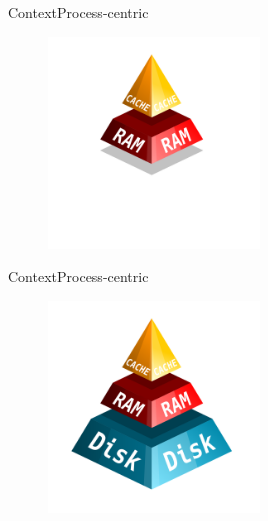 \documentclass[10pt]{beamer}
\begin{document}
\begin{frame}{Context}{Process-centric}
  \begin{figure}[ht]
    \centering
    \includegraphics[width=0.5\textwidth, keepaspectratio=true]{images/memory_hierarchy_ram_cache.png}
  \end{figure}
\end{frame}

\begin{frame}{Context}{Process-centric}
  \begin{figure}[ht]
    \centering
    \includegraphics[width=0.5\textwidth, keepaspectratio=true]{images/memory_hierarchy_disk_ram_cache.png}
  \end{figure}
\end{frame}

\end{document}
